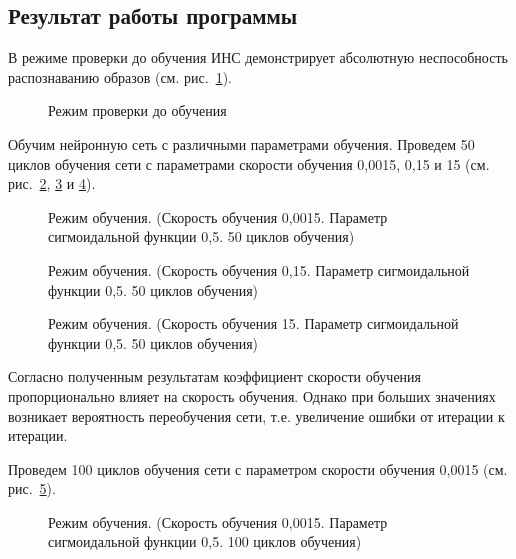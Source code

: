\subsection{Результат работы программы}


В режиме проверки до обучения ИНС демонстрирует абсолютную неспособность распознаванию образов (см. рис.~\ref{ris:Check}).

\begin{figure}[h]
\caption{Режим проверки до обучения}
\label{ris:Check}
\end{figure}

Обучим нейронную сеть с различными параметрами обучения.
Проведем 50 циклов обучения сети с параметрами скорости обучения 0,0015, 0,15 и 15 (см. рис.~\ref{ris:stud_0,0015_0,5_50}, \ref{ris:stud_0,15_0,5_50} и \ref{ris:stud_15_0,5_50}).

\begin{figure}[H]
\caption{Режим обучения. (Скорость обучения 0,0015. Параметр сигмоидальной функции 0,5. 50 циклов обучения)}
\label{ris:stud_0,0015_0,5_50}
\end{figure}

\begin{figure}[H]
\caption{Режим обучения. (Скорость обучения 0,15. Параметр сигмоидальной функции 0,5. 50 циклов обучения)}
\label{ris:stud_0,15_0,5_50}
\end{figure}

\begin{figure}[H]
\caption{Режим обучения. (Скорость обучения 15. Параметр сигмоидальной функции 0,5. 50 циклов обучения)}
\label{ris:stud_15_0,5_50}
\end{figure}

Согласно полученным результатам коэффициент скорости обучения пропорционально влияет на скорость обучения. 
Однако при больших значениях возникает вероятность переобучения сети, т.е. увеличение ошибки от итерации к итерации.


Проведем 100 циклов обучения сети с параметром скорости обучения 0,0015 (см. рис.~\ref{ris:stud_0,0015_0,5_100}).

\begin{figure}[h]
\caption{Режим обучения. (Скорость обучения 0,0015. Параметр сигмоидальной функции 0,5. 100 циклов обучения)}
\label{ris:stud_0,0015_0,5_100}
\end{figure}

